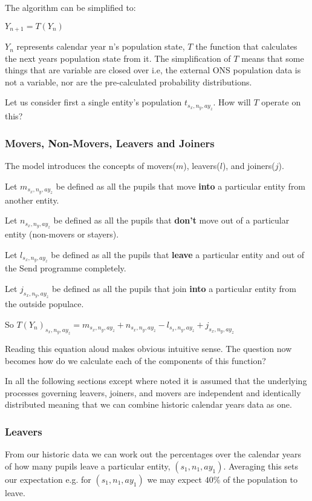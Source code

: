 \documentclass[margin=5mm]{article}
\begin{document}
The algorithm can be simplified to:

$Y_{n+1} = T(Y_n)$

$Y_n$ represents calendar year n's population state, $T$ the function
that calculates the next years population state from it.  The
simplification of $T$ means that some things that are variable are
closed over i.e, the external ONS population data is not a variable,
nor are the pre-calculated probability distributions.

Let us consider first a single entity's population $t_{s_x,n_y,ay_z}$.
How will $T$ operate on this?

\subsubsection{Movers,  Non-Movers, Leavers and Joiners}

The model introduces the concepts of movers($m$), leavers($l$), and
joiners($j$).

Let $m_{s_x,n_y,ay_z}$ be defined as all the pupils that move
\textbf{into} a particular entity from another entity.

Let $n_{s_x,n_y,ay_z}$ be defined as all the pupils that
\textbf{don't} move out of a particular entity (non-movers or
stayers).

Let $l_{s_x,n_y,ay_z}$ be defined as all the pupils that
\textbf{leave} a particular entity and out of the Send programme
completely.

Let $j_{s_x,n_y,ay_z}$ be defined as all the pupils that join
\textbf{into} a particular entity from the outside populace.


So $T(Y_n)_{s_x,n_y,ay_z} = m_{s_x,n_y,ay_z} + n_{s_x,n_y,ay_z} -
l_{s_x,n_y,ay_z} + j_{s_x,n_y,ay_z} $

Reading this equation aloud makes obvious intuitive sense.  The
question now becomes how do we calculate each of the components of
this function?

In all the following sections except where noted it is assumed that
the underlying processes governing leavers, joiners, and movers are
independent and identically distributed meaning that we can combine
historic calendar years data as one.

\subsubsection{Leavers}

From our historic data we can work out the percentages over the
calendar years of how many pupils leave a particular entity,
$(s_1,n_1,ay_1)$.  Averaging this sets our expectation e.g. for
$(s_1,n_1,ay_1)$ we may expect $40\%$ of the population to leave.
\end{document}
